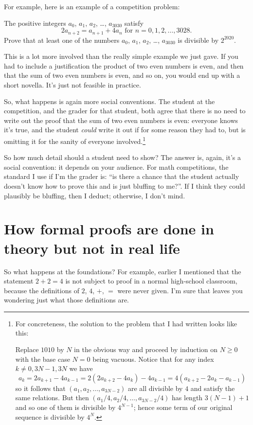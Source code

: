 \documentclass[11pt]{scrartcl}
\begin{document}
For example, here is an example of a competition problem:
\begin{problem}
The positive integers $a_0$, $a_1$, $a_2$, \dots, $a_{3030}$ satisfy
\[ 2a_{n + 2} = a_{n + 1} + 4a_n \text{ for } n = 0, 1, 2, \ldots, 3028.  \]
Prove that at least one of the numbers
$a_0$, $a_1$, $a_2$, \dots, $a_{3030}$ is divisible by $2^{2020}$.
\end{problem}
This is a lot more involved than the really simple example we just gave.
If you had to include a justification the product of two even numbers is
even, and then that the sum of two even numbers is even, and so on,
you would end up with a short novella.
It's just not feasible in practice.

So, what happens is again more social conventions.
The student at the competition, and the grader for that student,
both agree that there is no need to write out the proof that
the sum of two even numbers is even: everyone knows it's true,
and the student \emph{could} write it out if for some reason they had to,
but is omitting it for the sanity of everyone involved.\footnote{For
concreteness, the solution to the problem that I had written looks like this:

Replace $1010$ by $N$ in the obvious way and proceed by induction on $N \ge 0$
with the base case $N = 0$ being vacuous.
Notice that for any index $k \neq 0, 3N-1, 3N$ we have
\[ a_k = 2a_{k+1} - 4a_{k-1} = 2(2a_{k+2}-4a_k)-4a_{k-1}
  = 4(a_{k+2}-2a_k-a_{k-1}) \]
so it follows that $(a_1, a_2, \dots, a_{3N-2})$
are all divisible by $4$ and satisfy the same relations.
But then $(a_1/4, a_2/4, \dots, a_{3N-2}/4)$ has length $3(N-1)+1$
and so one of them is divisible by $4^{N-1}$;
hence some term of our original sequence is divisible by $4^N$.}

So how much detail should a student need to show?
The answer is, again, it's a social convention: it depends on your audience.
For math competitions, the standard I use if I'm the grader is:
``is there a chance that the student actually doesn't know how to prove
this and is just bluffing to me?''.
If I think they could plausibly be bluffing, then I deduct;
otherwise, I don't mind.

\section{How formal proofs are done in theory but not in real life}
\label{sec:theory}

So what happens at the foundations?
For example, earlier I mentioned that the statement $2+2=4$
is not subject to proof in a normal high-school classroom,
because the definitions of $2$, $4$, $+$, $=$ were never given.
I'm sure that leaves you wondering just what those definitions are.
\end{document}
